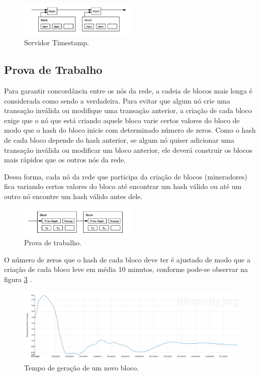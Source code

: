 \begin{figure}[ht]
\centering
\includegraphics[width=0.5\textwidth]{Cap1/blockchain_timestamp}
\caption{Servidor Timestamp.}
\label{blockchain_timestamp}
\end{figure}

\subsection{Prova de Trabalho}

Para garantir concordância entre os nós da rede, a cadeia de blocos mais longa é considerada como sendo a verdadeira. Para evitar que algum nó crie uma transação inválida ou modifique uma transação anterior, a criação de cada bloco exige que o nó que está criando aquele bloco varie certos valores do bloco de modo que o hash do bloco inicie com determinado número de zeros. Como o hash de cada bloco depende do hash anterior, se algum nó quiser adicionar uma transação inválida ou modificar um bloco anterior, ele deverá construir os blocos mais rápidos que os outros nós da rede. 

Dessa forma, cada nó da rede que participa da criação de blocos (mineradores) fica variando certos valores do bloco até encontrar um hash válido ou até um outro nó encontre um hash válido antes dele.

\begin{figure}[ht]
\centering
\includegraphics[width=0.5\textwidth]{Cap1/pow}
\caption{Prova de trabalho.}
\label{pow}
\end{figure}

O número de zeros que o hash de cada bloco deve ter é ajustado de modo que a criação de cada bloco leve em média 10 minutos, conforme pode-se observar na figura \ref{block_avg_time} \cite{time_avg_block}.

\begin{figure}[ht]
\centering
\includegraphics[width=1\textwidth]{Cap1/block_avg_time}
\caption{Tempo de geração de um novo bloco.}
\label{block_avg_time}
\end{figure}

